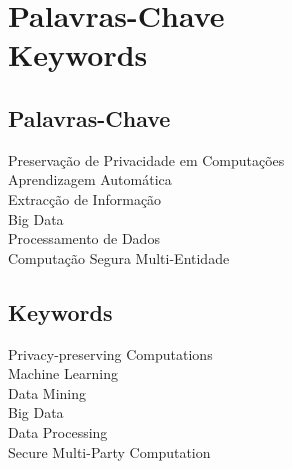 %

\chapter*{Palavras-Chave \\ Keywords}
\thispagestyle{empty}

\section*{Palavras-Chave} %
{\large

Preserva\c{c}\~{a}o de Privacidade em Computa\c{c}\~{o}es      \\
Aprendizagem Autom\'{a}tica         \\
Extrac\c{c}\~{a}o de Informa\c{c}\~{a}o \\
Big Data                                \\
Processamento de Dados                  \\
Computa\c{c}\~{a}o Segura Multi-Entidade\\
}

\section*{Keywords} %
{\large
Privacy-preserving Computations\\
Machine Learning               \\
Data Mining					   \\
Big Data 					   \\
Data Processing                \\
Secure Multi-Party Computation \\
}

\vfill

\cleardoublepage
